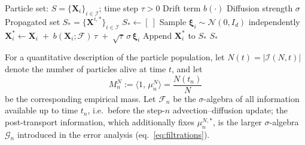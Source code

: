 \documentclass[a4paper,fleqn]{cas-sc}
\theoremstyle{definition}
\theoremstyle{remark}
\begin{document}
\begin{algorithm}
\caption{SDE propagation of the advection--diffusion step}\label{alg:sde}
\begin{algorithmic}
\Require Particle set: $S=\{\mathbf{X}_i\}_{i\in\mathcal I}$; time step $\tau>0$
\Require Drift term $b(\cdot)$
\Require Diffusion strength $\sigma$
\Ensure Propagated set $S_*=\{\mathbf{X}^{i,*}\}_{i\in\mathcal I}$
  \State $S_{*}\gets [\ ]$
    \State Sample $\boldsymbol{\xi}_i \sim \mathcal N(0,I_d)$ independently
    \State $\mathbf{X}^*_i \gets \mathbf{X}_i \;+\; b(\mathbf{X}_i;\mathcal F)\,\tau \;+\; \sqrt{\tau}\,\sigma\,\boldsymbol{\xi}_i$
    \State Append $\mathbf{X}^{*}_i$ to $S_{*}$
  \EndFor
  \State \Return $S_{*}$
\EndProcedure
\end{algorithmic}
\end{algorithm}

For a quantitative description of the particle population, let
$N(t)=\lvert\mathcal I(N,t)\rvert$ denote the number of particles alive at
time $t$, and let
\[
   M^N_n := \big\langle 1,\,\mu^N_n\big\rangle
   =\frac{N(t_n)}{N}
\]
be the corresponding empirical mass. Let $\mathcal F_n$ be the
$\sigma$-algebra of all information available up to time $t_n$, i.e.\ before the
step-$n$ advection--diffusion update; the post-transport information, which
additionally fixes $\mu^{N,*}_n$, is the larger $\sigma$-algebra $\mathcal G_n$
introduced in the error analysis (eq.~\eqref{eq:filtrations}).
\end{document}
